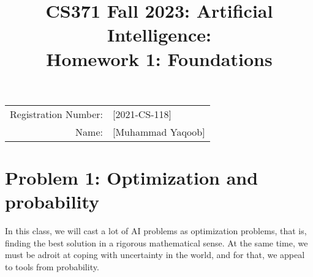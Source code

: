 \documentclass{article}
\title{\textbf{CS371 Fall 2023: Artificial Intelligence: \\Homework 1: Foundations}}
\date{}
\theoremstyle{case}
\theoremstyle{definition}
\begin{document}
\maketitle

\begin{center}
\begin{tabular}{rl}
Registration Number: & [2021-CS-118] \\
Name: & [Muhammad Yaqoob] \\
\end{tabular}
\end{center}

\section*{Problem 1: Optimization and probability}

In this class, we will cast a lot of AI problems as optimization problems, that is, finding the best solution in a rigorous mathematical sense.
At the same time, we must be adroit at coping with uncertainty in the world, and for that, we appeal to tools from probability.
\end{document}
